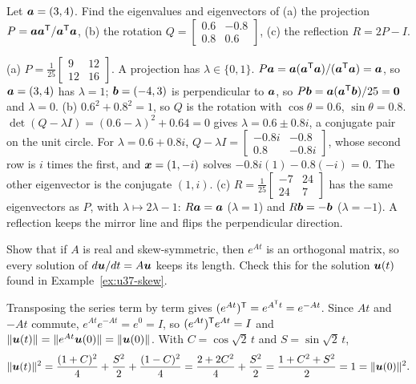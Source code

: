 \begin{exercise}\label{exr:u37-pqr}
Let $\boldsymbol{a}=(3,4)$. Find the eigenvalues and eigenvectors of (a) the projection $P=\boldsymbol{a}\boldsymbol{a}^{\mathsf{T}}/\boldsymbol{a}^{\mathsf{T}}\boldsymbol{a}$, (b) the rotation $Q=\begin{bmatrix}0.6&-0.8\\0.8&0.6\end{bmatrix}$, (c) the reflection $R=2P-I$.
\end{exercise}
\begin{solution}
(a) $P=\frac{1}{25}\begin{bmatrix}9&12\\12&16\end{bmatrix}$. A projection has $\lambda\in\{0,1\}$. $P\boldsymbol{a}=\boldsymbol{a}(\boldsymbol{a}^{\mathsf{T}}\boldsymbol{a})/(\boldsymbol{a}^{\mathsf{T}}\boldsymbol{a})=\boldsymbol{a}$, so $\boldsymbol{a}=(3,4)$ has $\lambda=1$; $\boldsymbol{b}=(-4,3)$ is perpendicular to $\boldsymbol{a}$, so $P\boldsymbol{b}=\boldsymbol{a}(\boldsymbol{a}^{\mathsf{T}}\boldsymbol{b})/25=\boldsymbol{0}$ and $\lambda=0$.
(b) $0.6^{2}+0.8^{2}=1$, so $Q$ is the rotation with $\cos\theta=0.6$, $\sin\theta=0.8$. $\det(Q-\lambda I)=(0.6-\lambda)^{2}+0.64=0$ gives $\lambda=0.6\pm0.8i$, a conjugate pair on the unit circle. For $\lambda=0.6+0.8i$, $Q-\lambda I=\begin{bmatrix}-0.8i&-0.8\\0.8&-0.8i\end{bmatrix}$, whose second row is $i$ times the first, and $\boldsymbol{x}=(1,-i)$ solves $-0.8i(1)-0.8(-i)=0$. The other eigenvector is the conjugate $(1,i)$.
(c) $R=\frac{1}{25}\begin{bmatrix}-7&24\\24&7\end{bmatrix}$ has the same eigenvectors as $P$, with $\lambda\mapsto2\lambda-1$: $R\boldsymbol{a}=\boldsymbol{a}$ ($\lambda=1$) and $R\boldsymbol{b}=-\boldsymbol{b}$ ($\lambda=-1$). A reflection keeps the mirror line and flips the perpendicular direction.
\end{solution}

\begin{exercise}\label{exr:u37-expskew}
Show that if $A$ is real and skew-symmetric, then $e^{At}$ is an orthogonal matrix, so every solution of $d\boldsymbol{u}/dt=A\boldsymbol{u}$ keeps its length. Check this for the solution $\boldsymbol{u}(t)$ found in Example~\ref{ex:u37-skew}.
\end{exercise}
\begin{solution}
Transposing the series term by term gives $(e^{At})^{\mathsf{T}}=e^{A^{\mathsf{T}} t}=e^{-At}$. Since $At$ and $-At$ commute, $e^{At}e^{-At}=e^{0}=I$, so $(e^{At})^{\mathsf{T}} e^{At}=I$ and $\|\boldsymbol{u}(t)\|=\|e^{At}\boldsymbol{u}(0)\|=\|\boldsymbol{u}(0)\|$. With $C=\cos\sqrt2\,t$ and $S=\sin\sqrt2\,t$,
\[
\|\boldsymbol{u}(t)\|^{2}=\frac{(1+C)^{2}}{4}+\frac{S^{2}}{2}+\frac{(1-C)^{2}}{4}=\frac{2+2C^{2}}{4}+\frac{S^{2}}{2}=\frac{1+C^{2}+S^{2}}{2}=1=\|\boldsymbol{u}(0)\|^{2}.
\]
\end{solution}

